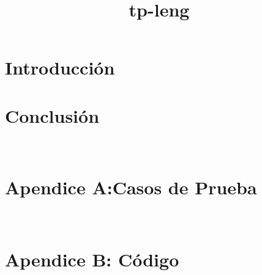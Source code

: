 \documentclass[hidelinks,a4paper,12pt, nofootinbib]{article}
\title{tp-leng}
\begin{document}
\maketitle

\tableofcontents
\newpage


\section{Introducción}

\newpage


\newpage

\section{Conclusión}



\newpage
\printbibliography
\appendix
\section{\\Apendice A:Casos de Prueba}\label{App:AppendixA}

\section{\\Apendice B: Código} \label{App:AppendixB}
  
\end{document}
